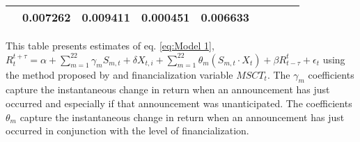 \begin{sidewaystable}
{\begin{tabular}{@{}lllllllllllll@{}}
                             & \multicolumn{2}{c}{ 0.007262 }                                                 & \multicolumn{2}{c}{ 0.009411 }                                                 & \multicolumn{2}{c}{ 0.000451 }                                                   & \multicolumn{2}{c}{ 0.006633 }                                                 \\ \bottomrule 
\end{tabular}
}
\begin{tablenotes}\item 
    \singlespacing
    \footnotesize
    This table presents estimates of eq. \ref{eq:Model 1}, $R_{t}^{t+\tau}=\alpha+\sum_{m=1}^{22} \gamma_m S_{m,t}+ \delta X_{t,i} + \sum_{m=1}^{22} \theta_m (S_{m,t} \cdot X_t)+\beta R_{t-\tau}^{t}+\epsilon_{t}$ using the method proposed by \citet{kurov2019price} and financialization variable $MSCT_t$. The $\gamma_m$ coefficients capture the instantaneous change in return when an announcement has just occurred and especially if that announcement was unanticipated. The coefficients $\theta_m$ capture the instantaneous change in return when an announcement has just occurred in conjunction with the level of financialization.
\end{tablenotes}
\end{sidewaystable}

